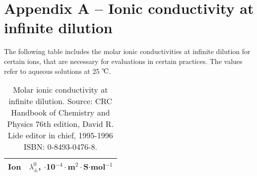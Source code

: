 \section*{Appendix A -- Ionic conductivity at infinite dilution}
The following table includes the molar ionic conductivities at infinite dilution for certain ions, that are necessary for evaluations in certain practices. The values refer to aqueous solutions at 25 $\celsius$.

\begin{table}[h!]
\centering
\caption{Molar ionic conductivity at infinite dilution. Source: CRC Handbook of Chemistry and Physics 76th edition, David R. Lide editor in chief, 1995-1996 ISBN: 0-8493-0476-8.}
\label{table:conductivities}
\vspace{5mm}
\begin{tabular}{l|c}
                        Ion \hspace{2cm} & $\lambda^0_\pm$, $\cdot$10$^{-4}\cdot$m$^2 \cdot$S$\cdot$mol$^{-1}$\\
                      \hline



\end{tabular}
\end{table}
